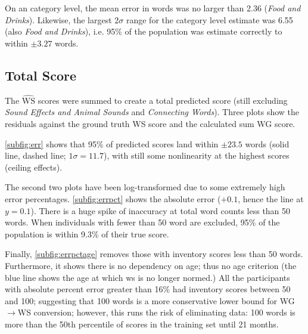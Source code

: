 \documentclass[letterpaper]{article}
\newcommand{\sounds}{\textit{Sound Effects and Animal Sounds}}
\newcommand{\cwords}{\textit{Connecting Words}}
\newcommand{\food}{\textit{Food and Drinks}}
\newcommand{\wshat}{$\hat{\textrm{WS}}$}
\begin{document}
	On an category level, the mean error in words was no larger than 2.36
	(\food{}). Likewise, the largest 2$\sigma$ range for the category level estimate
	was 6.55 (also \food{}), i.e. 95\% of the population was estimate correctly
	to within $\pm3.27$ words.

    \subsection{Total Score}

    The \wshat{} scores were summed to create a total predicted score (still
    excluding \sounds{} and \cwords{}). Three plots show the residuals against the
    ground truth WS score and the calculated sum WG score.

    \autoref{subfig:err} shows that 95\% of predicted scores land within $\pm23.5$ words
    (solid line, dashed line; $1\sigma=11.7$),
    with still some nonlinearity at the highest scores (ceiling effects).

    The second two plots have been log-transformed due to some extremely high
    error percentages.
    \autoref{subfig:errpct} shows the absolute error ($+0.1$, hence the line at
    $y=0.1$).
    There is a huge spike of inaccuracy at total word counts less than 50
    words. When
    individuals with fewer than 50 word are excluded, 95\% of the population is
    within 9.3\%
    of their true score.

    Finally, \autoref{subfig:errpctage} removes those with inventory scores
    less than 50 words. Furthermore, it shows there is no dependency on age;
    thus no age criterion (the blue line shows the age at which \gls{ws} is
    no longer normed.) All the participants with absolute percent error greater
    than 16\% had inventory scores between 50 and 100; suggesting that 100
    words is a more conservative lower bound for WG$\rightarrow$WS conversion;
    however, this runs the risk of eliminating data: 100 words is more than the
    50th percentile of scores in the training set until 21 months.
\end{document}
